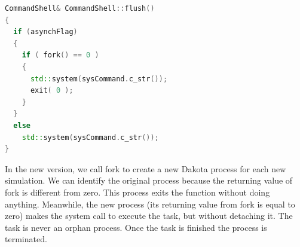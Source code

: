 \documentclass[12pt,a4paper,article]{memoir} %
\begin{document}
\begin{lstlisting}[style=MyCodeStyle,language=C++]
CommandShell& CommandShell::flush()
{
  if (asynchFlag)
  {
    if ( fork() == 0 )
    {
      std::system(sysCommand.c_str());
      exit( 0 );
    }
  }
  else
    std::system(sysCommand.c_str());
}
\end{lstlisting}

In the new version, we call fork to create a new Dakota process for each new simulation. We can identify the original process because the returning value of fork is different from zero. This process exits the function without doing anything. Meanwhile, the new process (its returning value from fork is equal to zero) makes the system call to execute the task, but without detaching it. The task is never an orphan process. Once the task is finished the process is terminated.

\end{document}
